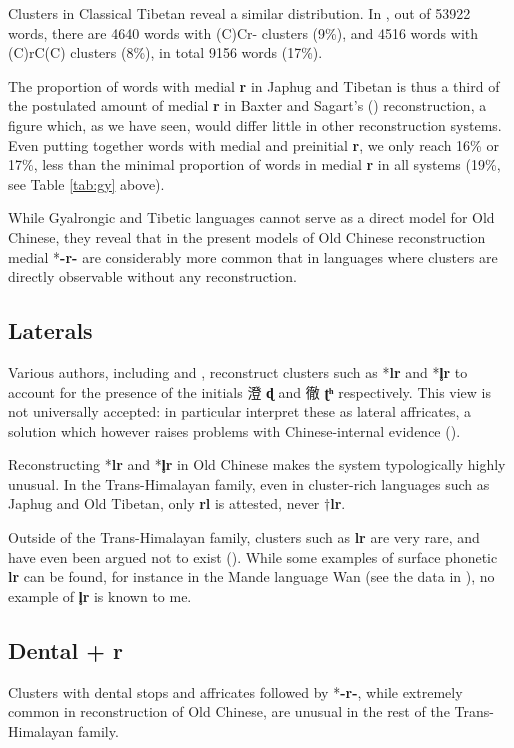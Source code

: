 \documentclass[oneside,a4paper,11pt]{article}
\newcommand{\ipa}[1]{{\phon\mbox{\textbf{#1}}}}
\newcommand{\zh}[1]{{\cn #1}}
\begin{document}
Clusters in Classical Tibetan reveal a similar distribution. In \citet{bodrgya}, out of 53922 words, there are 4640 words with (C)Cr- clusters (9\%), and 4516 words with (C)rC(C) clusters (8\%), in total 9156 words (17\%). 

The proportion of words with medial \ipa{r} in Japhug and Tibetan is thus a third of the postulated amount of medial \ipa{r} in Baxter and Sagart's (\citeyear{bs14oc}) reconstruction, a figure which, as we have seen, would differ little in other reconstruction systems. Even putting together words with medial and preinitial \ipa{r}, we only reach 16\% or 17\%, less than the minimal proportion of words in medial \ipa{r} in all systems (19\%, see Table \ref{tab:gy} above). 

While Gyalrongic and Tibetic languages cannot serve as a direct model for Old Chinese, they reveal that in the present models of Old Chinese reconstruction medial *\ipa{-r-} are considerably more common that in languages where clusters are directly observable without any reconstruction.

\subsection{Laterals}
Various authors, including \citet{schuessler09minimal} and \citet{bs14oc}, reconstruct clusters such as *\ipa{lr} and *\ipa{l̥r} to account for the presence of the initials \zh{澄} \ipa{ɖ} and \zh{徹} \ipa{ʈʰ} respectively. This view is not universally accepted: \citet[217-225]{starostin89} in particular interpret these as lateral affricates, a solution which however raises problems with Chinese-internal evidence (\citealt[36-40]{sagart99roc}).


Reconstructing *\ipa{lr} and *\ipa{l̥r} in Old Chinese makes the system typologically highly unusual. In the Trans-Himalayan family, even in cluster-rich languages such as Japhug and Old Tibetan, only \ipa{rl} is attested, never $\dagger$\ipa{lr}.

Outside of the Trans-Himalayan family, clusters such as \ipa{lr} are very rare, and have even been argued not to exist (\citealt[78]{baroni14invariant}). While some examples of surface phonetic \ipa{lr} can be found, for instance in the Mande language Wan (see the data in \citealt{nikitina12logophoric}), no example of \ipa{l̥r} is known to me.


\subsection{Dental + r}
Clusters with dental stops and affricates followed by *\ipa{-r-}, while extremely common in reconstruction of Old Chinese, are unusual in the rest of the Trans-Himalayan family.
\end{document}
